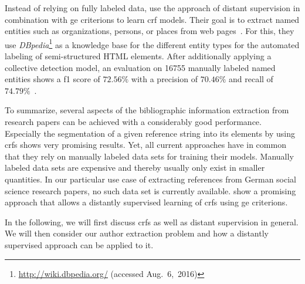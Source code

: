 \bigskip

Instead of relying on fully labeled data, \citet{lu2013web} use the approach of \gls{distant supervision} in combination with \glspl{ge criterion} to learn \gls{crf} models.
Their goal is to extract named entities such as organizations, persons, or places from web pages~\citep{lu2013web}.
For this, they use \textit{DBpedia}\footnote{\url{http://wiki.dbpedia.org/} (accessed Aug.~6,~2016)} as a knowledge base for the different entity types for the automated labeling of semi-structured HTML elements.
After additionally applying a collective detection model, an evaluation on \num{16755} manually labeled named entities shows a \gls{f1 score} of $72.56\%$ with a \gls{precision} of $70.46\%$ and \gls{recall} of $74.79\%$~\citep{lu2013web}.

\bigskip

To summarize, several aspects of the bibliographic information extraction from research papers can be achieved with a considerably good performance.
Especially the segmentation of a given reference string into its elements by using \glspl{crf} \citep{peng2004accurate,councill2008parscit,groza2012reference} shows very promising results.
Yet, all current approaches have in common that they rely on manually labeled data sets for training their models.
Manually labeled data sets are expensive and thereby usually only exist in smaller quantities.
In our particular use case of extracting references from German social science research papers, no such data set is currently available.
\citet{lu2013web} show a promising approach that allows a distantly supervised learning of \glspl{crf} using \glspl{ge criterion}.

In the following, we will first discuss \glspl{crf} as well as \gls{distant supervision} in general.
We will then consider our author extraction problem and how a distantly supervised approach can be applied to it.

